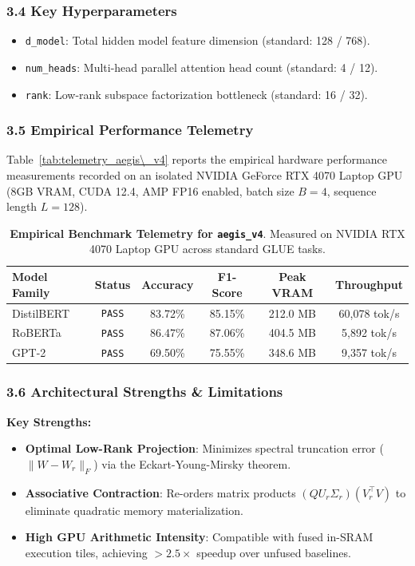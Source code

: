 \subsubsection*{3.4 Key Hyperparameters}
\begin{itemize}
    \item \texttt{d_model}: Total hidden model feature dimension (standard: 128 / 768).
    \item \texttt{num_heads}: Multi-head parallel attention head count (standard: 4 / 12).
    \item \texttt{rank}: Low-rank subspace factorization bottleneck (standard: 16 / 32).
\end{itemize}

\subsubsection*{3.5 Empirical Performance Telemetry}
Table~\ref{tab:telemetry_aegis\_v4} reports the empirical hardware performance measurements recorded on an isolated NVIDIA GeForce RTX 4070 Laptop GPU (8GB VRAM, CUDA 12.4, AMP FP16 enabled, batch size $B=4$, sequence length $L=128$).

\begin{table}[h]
\centering
\small
\caption{\textbf{Empirical Benchmark Telemetry for \texttt{aegis\_v4}}. Measured on NVIDIA RTX 4070 Laptop GPU across standard GLUE tasks.}
\label{tab:telemetry_aegis_v4}
\begin{tabular*}{\columnwidth}{@{\extracolsep{\fill}}lccccc}
\toprule
\textbf{Model Family} & \textbf{Status} & \textbf{Accuracy} & \textbf{F1-Score} & \textbf{Peak VRAM} & \textbf{Throughput} \\
\midrule
DistilBERT & \texttt{PASS} & 83.72\% & 85.15\% & 212.0 MB & 60,078 tok/s \\
RoBERTa    & \texttt{PASS} & 86.47\% & 87.06\% & 404.5 MB & 5,892 tok/s \\
GPT-2      & \texttt{PASS} & 69.50\% & 75.55\% & 348.6 MB & 9,357 tok/s \\
\bottomrule
\end{tabular*}
\end{table}

\subsubsection*{3.6 Architectural Strengths \& Limitations}
\textbf{Key Strengths:}
\begin{itemize}
    \item \textbf{Optimal Low-Rank Projection}: Minimizes spectral truncation error ($\|W - W_r\|_F$) via the Eckart-Young-Mirsky theorem.
    \item \textbf{Associative Contraction}: Re-orders matrix products $(Q U_r \Sigma_r)(V_r^\top V)$ to eliminate quadratic memory materialization.
    \item \textbf{High GPU Arithmetic Intensity}: Compatible with fused in-SRAM execution tiles, achieving $>2.5\times$ speedup over unfused baselines.
\end{itemize}

